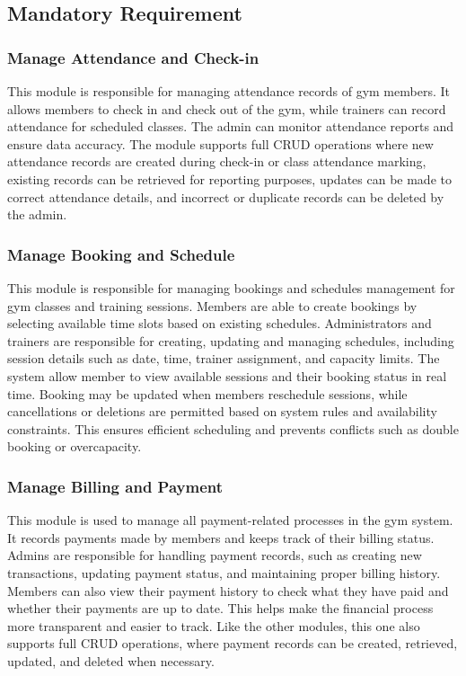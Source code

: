 \documentclass[12pt, a4paper]{article}
\begin{document}
\subsection{Mandatory Requirement}

\subsubsection{Manage Attendance and Check-in}
This module is responsible for managing attendance records of gym members. 
It allows members to check in and check out of the gym, while trainers can record attendance for scheduled classes. 
The admin can monitor attendance reports and ensure data accuracy. 
The module supports full CRUD operations where new attendance records are created during check-in or class attendance marking, existing records can be retrieved for reporting purposes, updates can be made to correct attendance details, and incorrect or duplicate records can be deleted by the admin. 

\subsubsection{Manage Booking and Schedule} 
This module is responsible for managing bookings and schedules management for gym classes and training sessions. 
Members are able to create bookings by selecting available time slots based on existing schedules. 
Administrators and trainers are responsible for creating, updating and managing schedules, including session details such as date, time, trainer assignment, and capacity limits. 
The system allow member to view available sessions and their booking status in real time. 
Booking may be updated when members reschedule sessions, while cancellations or deletions are permitted based on system rules and availability constraints. 
This ensures efficient scheduling and prevents conflicts such as double booking or overcapacity. 

\subsubsection{Manage Billing and Payment} 
This module is used to manage all payment-related processes in the gym system. 
It records payments made by members and keeps track of their billing status. 
Admins are responsible for handling payment records, such as creating new transactions, updating payment status, and maintaining proper billing history. 
Members can also view their payment history to check what they have paid and whether their payments are up to date. 
This helps make the financial process more transparent and easier to track. 
Like the other modules, this one also supports full CRUD operations, where payment records can be created, retrieved, updated, and deleted when necessary. 
\end{document}
